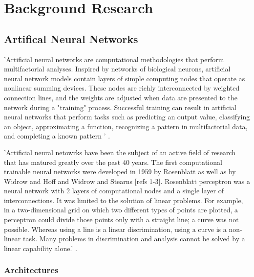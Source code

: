
\chapter{Background Research} %

\label{Chapter2} %


\section{Artifical Neural Networks}

'Artificial neural networks are computational methodologies that perform multifactorial analyses. Inspired by networks of biological neurons, artificial neural network models contain layers of simple computing nodes that operate as nonlinear summing devices. These nodes are richly interconnected by weighted connection lines, and the weights are adjusted when data are presented to the network during a "training" process. Successful training can result in artificial neural networks that perform tasks such as predicting an output value, classifying an object, approximating a function, recognizing a pattern in multifactorial data, and completing a known pattern ' \cite{dayhoff2001artificial}.

'Artificial neural netowrks have been the subject of an active field of research that has matured greatly over the past 40 years. The first computational trainable neural networks were developed in 1959 by Rosenblatt as well as by Widrow and Hoff and Widrow and Stearns [refs 1-3]. Rosenblatt perceptron was a neural network with 2 layers of computational nodes and a single layer of interconnections. It was limited to the solution of linear problems. For example, in a two-dimensional grid on which two different types of points are plotted, a perceptron could divide those points only with a straight line; a curve was not possible. Whereas using a line is a linear discrimination, using a curve is a non-linear task. Many problems in discrimination and analysis cannot be solved by a linear capability alone.' \cite{dayhoff2001artificial}.

\subsection{Architectures}

